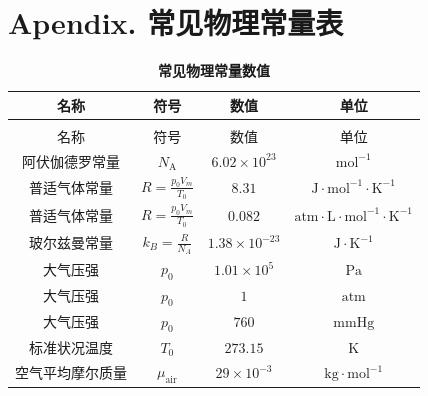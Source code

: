 \documentclass[zihao=5,UTF8]{report}
\begin{document}
\newpage
\nocite{*}



\newpage
\appendix
{}
\titleformat{\subsection}{\normalsize\bfseries}{\thesubsection}{1em}{}

\section*{Apendix. 常见物理常量表}
\begin{longtable}[H]{cccc}
    \caption{\textbf{常见物理常量数值}}\\
    \toprule
    名称 & 符号&  数值& 单位\\
    \midrule
    \endfirsthead
    \bottomrule
    \endfoot

    \toprule
    \multicolumn{4}{c}{\textbf{续上表}}\\
    \midrule
    名称 & 符号&  数值& 单位\\
    \midrule
    \endhead
    \bottomrule
    \endlastfoot
    阿伏伽德罗常量& $N_\text{A}$ & $6.02\times 10^{23}  $ & $\mathrm{mol}^{-1}$\\
    普适气体常量& $R=\frac{p_0V_m}{T_0} $& $8.31$& $\mathrm{J\cdot mol^{-1} \cdot K^{-1}}$\\
    普适气体常量& $R=\frac{p_0V_m}{T_0} $& $0.082$& $\mathrm{atm\cdot L\cdot mol^{-1} \cdot K^{-1}}$\\ 
    玻尔兹曼常量& $k_B=\frac{R}{N_A} $& $1.38\times10^{-23}$& $\mathrm{J\cdot K^{-1}}$\\
    大气压强& $p_0$& $1.01\times 10^5$& $\mathrm{Pa}$\\
    大气压强& $p_0$& $1$& $\mathrm{atm}$\\
    大气压强& $p_0$& $760$& $\mathrm{mmHg}$\\
    标准状况温度& $T_0$& $273.15$& $\mathrm{K}$\\
    空气平均摩尔质量& $\mu_{\text{air}}$& $29\times 10^{-3}$& $\mathrm{kg\cdot mol^{-1}}$
\end{longtable}
\end{document}
